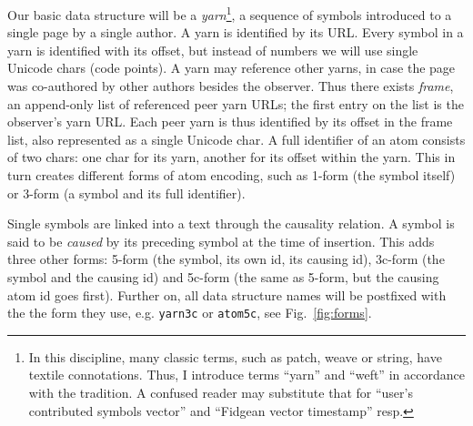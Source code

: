 \documentclass{sig-alternate}
\begin{document}
Our basic data structure will be a \emph{yarn}\footnote{In this discipline, many classic terms, such as patch, weave or string, have textile connotations. Thus, I introduce terms ``yarn'' and ``weft'' in accordance with the tradition. A confused reader may substitute that for ``user's contributed symbols vector'' and ``Fidgean vector timestamp'' resp.}, a sequence of symbols introduced to a single page by a single author.
A yarn is identified by its URL.
Every symbol in a yarn is identified with its offset, but instead of numbers we will use single Unicode chars (code points).
A yarn may reference other yarns, in case the page was co-authored by other authors besides the observer.
Thus there exists \emph{frame}, an append-only list of referenced peer yarn URLs; the first entry on the list is the observer's yarn URL.
Each peer yarn is thus identified by its offset in the frame list, also represented as a single Unicode char.
A full identifier of an atom consists of two chars: one char for its yarn, another for its offset within the yarn.
This in turn creates different forms of atom encoding, such as 1-form (the symbol itself) or 3-form (a symbol and its full identifier).

Single symbols are linked into a text through the causality relation.
A symbol is said to be \emph{caused} by its preceding symbol at the time of insertion.
This adds three other forms: 5-form (the symbol, its own id, its causing id), 3c-form (the symbol and the causing id) and 5c-form (the same as 5-form, but the causing atom id goes first).
Further on, all data structure names will be postfixed with the the form they use, e.g. {\tt yarn3c} or {\tt atom5c}, see Fig.~\ref{fig:forms}.
\end{document}
